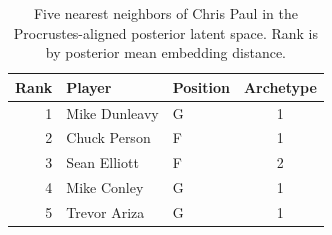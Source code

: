 \begin{table}[htbp]
  \centering\small
  \begin{tabular}{rllc}
    \toprule
    Rank & Player & Position & Archetype \\
    \midrule
    1 & Mike Dunleavy & G & 1 \\
    2 & Chuck Person & F & 1 \\
    3 & Sean Elliott & F & 2 \\
    4 & Mike Conley & G & 1 \\
    5 & Trevor Ariza & G & 1 \\
    \bottomrule
  \end{tabular}
  \caption{Five nearest neighbors of Chris Paul in the Procrustes-aligned posterior latent space. Rank is by posterior mean embedding distance.}
  \label{tab:Chris_Paul_neighbors}
\end{table}

